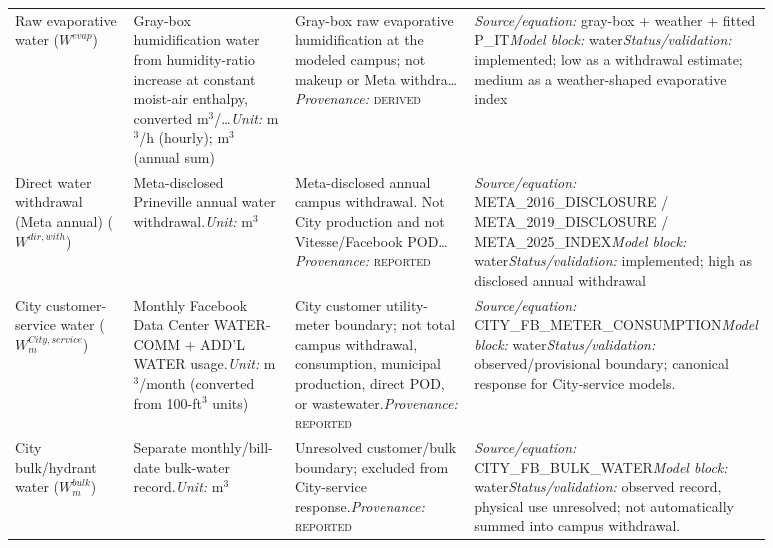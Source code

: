 \documentclass[11pt]{article}
\newcommand{\latesttxt}[1]{\textcolor{purple!85!black}{#1}}
\newcommand{\Reported}{\textsc{reported}}
\newcommand{\Derived}{\textsc{derived}}
\begin{document}
\begin{longtable}{@{}p{0.16\linewidth}p{0.22\linewidth}p{0.24\linewidth}p{0.26\linewidth}@{}}
Raw evaporative water ($W^{evap}$) & Gray-box humidification water from humidity-ratio increase at constant moist-air enthalpy, converted m$^{3}$/\ldots\newline \textit{Unit:} m$^{3}$/h (hourly); m$^{3}$ (annual sum) & Gray-box raw evaporative humidification at the modeled campus; not makeup or Meta withdra\ldots\newline \textit{Provenance:} \Derived{} & \textit{Source/equation:} gray-box + weather + fitted P\_IT\newline \textit{Model block:} water\newline \textit{Status/validation:} implemented; low as a withdrawal estimate; medium as a weather-shaped evaporative index\\
Direct water withdrawal (Meta annual) ($W^{dir,with}$) & Meta-disclosed Prineville annual water withdrawal.\newline \textit{Unit:} m$^{3}$ & Meta-disclosed annual campus withdrawal. Not City production and not Vitesse/Facebook POD\ldots\newline \textit{Provenance:} \Reported{} & \textit{Source/equation:} META\_2016\_DISCLOSURE / META\_2019\_DISCLOSURE / META\_2025\_INDEX\newline \textit{Model block:} water\newline \textit{Status/validation:} implemented; high as disclosed annual withdrawal\\
\latesttxt{City customer-service water ($W^{City,service}_m$)} & \latesttxt{Monthly Facebook Data Center WATER-COMM + ADD'L WATER usage.\newline \textit{Unit:} m$^3$/month (converted from 100-ft$^3$ units)} & \latesttxt{City customer utility-meter boundary; not total campus withdrawal, consumption, municipal production, direct POD, or wastewater.\newline \textit{Provenance:} \Reported{}} & \latesttxt{\textit{Source/equation:} CITY\_FB\_METER\_CONSUMPTION\newline \textit{Model block:} water\newline \textit{Status/validation:} observed/provisional boundary; canonical response for City-service models.}\\
\latesttxt{City bulk/hydrant water ($W^{bulk}_m$)} & \latesttxt{Separate monthly/bill-date bulk-water record.\newline \textit{Unit:} m$^3$} & \latesttxt{Unresolved customer/bulk boundary; excluded from City-service response.\newline \textit{Provenance:} \Reported{}} & \latesttxt{\textit{Source/equation:} CITY\_FB\_BULK\_WATER\newline \textit{Model block:} water\newline \textit{Status/validation:} observed record, physical use unresolved; not automatically summed into campus withdrawal.}\\

\end{longtable}
\end{document}
